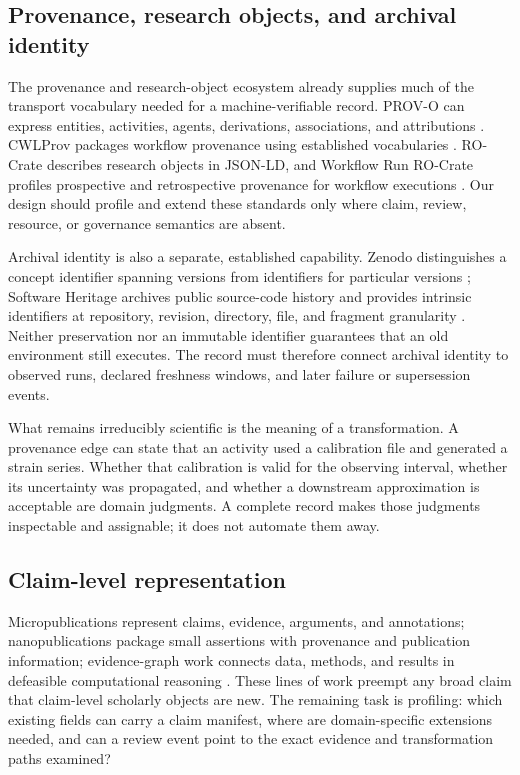 \documentclass[11pt]{article}
\begin{document}
\subsection{Provenance, research objects, and archival identity}

The provenance and research-object ecosystem already supplies much of the transport vocabulary needed for a machine-verifiable record. PROV-O can express entities, activities, agents, derivations, associations, and attributions \citep{w3c-prov-o-2013}. CWLProv packages workflow provenance using established vocabularies \citep{khan-cwlprov-2019}. RO-Crate describes research objects in JSON-LD, and Workflow Run RO-Crate profiles prospective and retrospective provenance for workflow executions \citep{ro-crate-1.2,workflow-run-ro-crate-2024}. Our design should profile and extend these standards only where claim, review, resource, or governance semantics are absent.

Archival identity is also a separate, established capability. Zenodo distinguishes a concept identifier spanning versions from identifiers for particular versions \citep{zenodo-doi-versioning}; Software Heritage archives public source-code history and provides intrinsic identifiers at repository, revision, directory, file, and fragment granularity \citep{dicosmo-software-heritage-2020}. Neither preservation nor an immutable identifier guarantees that an old environment still executes. The record must therefore connect archival identity to observed runs, declared freshness windows, and later failure or supersession events.

What remains irreducibly scientific is the meaning of a transformation. A provenance edge can state that an activity used a calibration file and generated a strain series. Whether that calibration is valid for the observing interval, whether its uncertainty was propagated, and whether a downstream approximation is acceptable are domain judgments. A complete record makes those judgments inspectable and assignable; it does not automate them away.

\subsection{Claim-level representation}

Micropublications represent claims, evidence, arguments, and annotations; nanopublications package small assertions with provenance and publication information; evidence-graph work connects data, methods, and results in defeasible computational reasoning \citep{micropublications-2014,nanopublications-2018,evi-2021}. These lines of work preempt any broad claim that claim-level scholarly objects are new. The remaining task is profiling: which existing fields can carry a claim manifest, where are domain-specific extensions needed, and can a review event point to the exact evidence and transformation paths examined?
\end{document}
